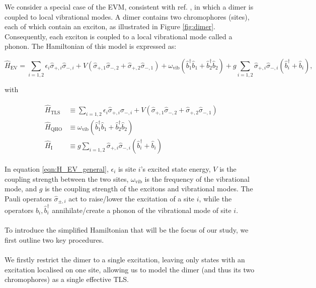 \documentclass[11pt]{article}
\begin{document}
\noindent We consider a special case of the EVM, consistent with ref. \cite{ExVib2014-Alexandra}, in which a dimer is coupled to local vibrational modes. A dimer contains two chromophores (sites), each of which contain an exciton, as illustrated in Figure \ref{fig:dimer}. Consequently, each exciton is coupled to a local vibrational mode called a phonon. The Hamiltonian of this model is expressed as:

\begin{equation} \label{eqn:H_EV_general}
    \hat{H}_{\scriptscriptstyle \text{EV}} = \sum_{i=1,2}\epsilon_i\hat{\sigma}_{+,i}\hat{\sigma}_{-,i} + V\left(\hat{\sigma}_{+,1}\hat{\sigma}_{-,2}+\hat{\sigma}_{+,2}\hat{\sigma}_{-,1}\right)
    + \omega_{\scriptscriptstyle \text{vib}} \left(\hat{b}_1^\dagger \hat{b}_1 + \hat{b}_2^\dagger \hat{b}_2\right)
    + g\sum_{i=1,2}\hat{\sigma}_{+,i}\hat{\sigma}_{-,i}\left(\hat{b}_i^\dagger + \hat{b}_i\right),
\end{equation}

with 

\begin{align*}
    \begin{aligned}
        \hat{H}_{\scriptscriptstyle \text{TLS}} &\equiv \sum_{i=1,2}\epsilon_i\hat{\sigma}_{+,i}\hat{\sigma}_{-,i} + V\left(\hat{\sigma}_{+,1}\hat{\sigma}_{-,2}+\hat{\sigma}_{+,2}\hat{\sigma}_{-,1}\right) \\
        \hat{H}_{\scriptscriptstyle \text{QHO}} &\equiv \omega_{\scriptscriptstyle \text{vib}} \left(\hat{b}_1^\dagger \hat{b}_1 + \hat{b}_2^\dagger \hat{b}_2\right) \\
        \hat{H}_{\scriptscriptstyle \text{I}} &\equiv g\sum_{i=1,2}\hat{\sigma}_{+,i}\hat{\sigma}_{-,i}\left(\hat{b}_i^\dagger + \hat{b}_i\right)
    \end{aligned}
\end{align*}

In equation \eqref{eqn:H_EV_general}, $\epsilon_i$ is site $i$'s excited state energy, $V$ is the coupling strength between the two sites, $\omega_{\scriptscriptstyle \text{vib}}$ is the frequency of the vibrational mode, and $g$ is the coupling strength of the excitons and vibrational modes. The Pauli operators $\hat{\sigma}_{\pm,i}$ act to raise/lower the excitation of a site $i$, while the operators $\hat{b}_i, \hat{b}_i^\dagger$ annihilate/create a phonon of the vibrational mode of site $i$.\\
\\
\noindent To introduce the simplified Hamiltonian that will be the focus of our study, we first outline two key procedures.\\
\\
We firstly restrict the dimer to a single excitation, leaving only states with an excitation localised on one site, allowing us to model the dimer (and thus its two chromophores) as a single effective TLS.
\end{document}
